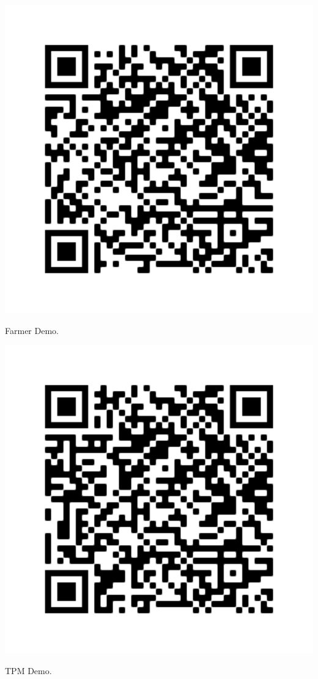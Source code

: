 \begin{minipage}{.33\textwidth}
	\centering
	\includegraphics[width=1\textwidth]{Images/QR code/FarmerQR.png}
	\captionsetup{type=figure}
	\caption{Farmer Demo.}
\end{minipage}
\begin{minipage}{.33\textwidth}
	\centering
	\includegraphics[width=1\textwidth]{Images/QR code/TPMQR.png}
	\captionsetup{type=figure}
	\caption{TPM Demo.}
\end{minipage}